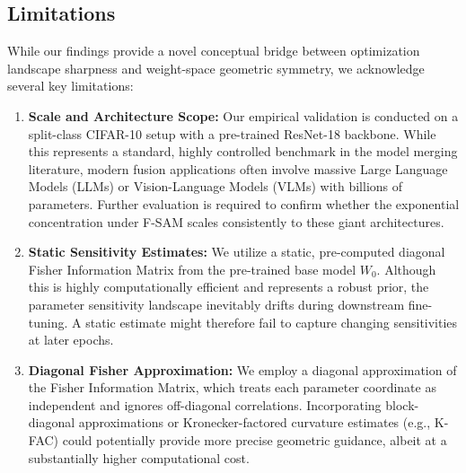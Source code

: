 \documentclass{article}
\theoremstyle{plain}
\theoremstyle{definition}
\theoremstyle{remark}
\begin{document}
\subsection{Limitations}
While our findings provide a novel conceptual bridge between optimization landscape sharpness and weight-space geometric symmetry, we acknowledge several key limitations:
\begin{enumerate}\setlength{\itemsep}{0pt}\setlength{\parskip}{0pt}\setlength{\parsep}{0pt}
    \item \textbf{Scale and Architecture Scope:} Our empirical validation is conducted on a split-class CIFAR-10 setup with a pre-trained ResNet-18 backbone. While this represents a standard, highly controlled benchmark in the model merging literature, modern fusion applications often involve massive Large Language Models (LLMs) or Vision-Language Models (VLMs) with billions of parameters. Further evaluation is required to confirm whether the exponential concentration under F-SAM scales consistently to these giant architectures.
    \item \textbf{Static Sensitivity Estimates:} We utilize a static, pre-computed diagonal Fisher Information Matrix from the pre-trained base model $W_0$. Although this is highly computationally efficient and represents a robust prior, the parameter sensitivity landscape inevitably drifts during downstream fine-tuning. A static estimate might therefore fail to capture changing sensitivities at later epochs.
    \item \textbf{Diagonal Fisher Approximation:} We employ a diagonal approximation of the Fisher Information Matrix, which treats each parameter coordinate as independent and ignores off-diagonal correlations. Incorporating block-diagonal approximations or Kronecker-factored curvature estimates (e.g., K-FAC) could potentially provide more precise geometric guidance, albeit at a substantially higher computational cost.
\end{enumerate}
\end{document}
